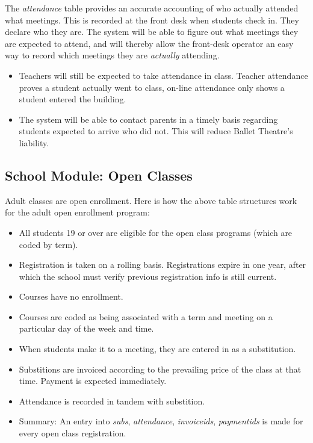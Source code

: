 \documentclass[11pt]{article}
\begin{document}
The \emph{attendance} table provides an accurate accounting of who actually attended what meetings.  This is recorded at the front desk when students check in.  They declare who they are.  The system will be able to figure out what meetings they are expected to attend, and will thereby allow the front-desk operator an easy way to record which meetings they are \emph{actually} attending.

\begin{itemize}

 \item Teachers will still be expected to take attendance in class.  Teacher attendance proves a student actually went to class, on-line attendance only shows a student entered the building.

 \item The system will be able to contact parents in a timely basis regarding students expected to arrive who did not.  This will reduce Ballet Theatre's liability.

 \end{itemize}

\subsection{School Module: Open Classes}

Adult classes are open enrollment.  Here is how the above table structures work for the adult open enrollment program:
 \begin{itemize}
 \item All students 19 or over are eligible for the open class programs (which are coded by term).
 \item Registration is taken on a rolling basis.  Registrations expire in one year, after which the school must verify previous registration info is still current.
 \item Courses have no enrollment.
 \item Courses are coded as being associated with a term and meeting on a particular day of the week and time.
 \item When students make it to a meeting, they are entered in as a substitution.
 \item Substitions are invoiced according to the prevailing price of the class at that time.  Payment is expected immediately.
 \item Attendance is recorded in tandem with substition.
 \item Summary: An entry into \emph{subs}, \emph{attendance}, \emph{invoiceids}, \emph{paymentids} is made for every open class registration.
 \end{itemize}
\end{document}
